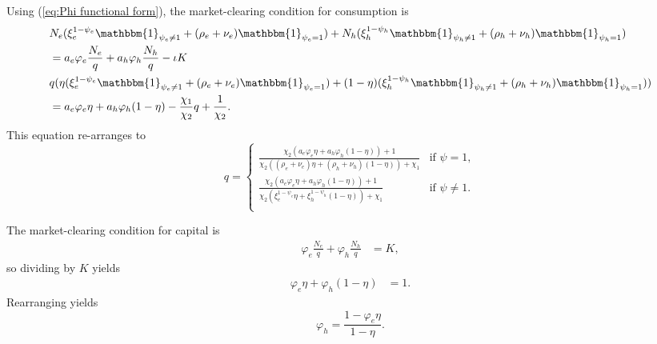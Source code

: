 \documentclass[12 pt, oneside]{article}
\theoremstyle{definition}
\theoremstyle{definition}
\theoremstyle{definition}
\begin{document}
Using (\ref{eq:Phi functional form}), the market-clearing condition for consumption is
\begin{align*}
& N_e(\xi_e^{1 - \psi_e}\mathbbm{1}_{\psi_e\neq 1} + (\rho_e + \nu_e)\mathbbm{1}_{\psi_e =1})+  N_h(\xi_h^{1 - \psi_h}\mathbbm{1}_{\psi_h\neq 1} + (\rho_h + \nu_h)\mathbbm{1}_{\psi_h = 1})\\
& =a_e\varphi_e \frac{N_e}{q} + a_h\varphi_h \frac{N_h}{q} - \iota K\\
& q(\eta(\xi_e^{1 - \psi_e}\mathbbm{1}_{\psi_e\neq 1} + (\rho_e + \nu_e)\mathbbm{1}_{\psi_e =1}) + (1 - \eta)(\xi_h^{1 - \psi_h}\mathbbm{1}_{\psi_h\neq 1} + (\rho_h + \nu_h)\mathbbm{1}_{\psi_h = 1}))\\
& =a_e\varphi_e\eta  + a_h\varphi_h (1 - \eta)  - \frac{\chi_1}{\chi_2}q + \frac{1}{\chi_2}.
\end{align*}
This equation re-arranges to %
\begin{equation}
  \label{eq:q closed form}
    q  =
    \begin{cases}
      \frac{\chi_2(a_e \varphi_e \eta + a_h \varphi_h(1 - \eta)) + 1}{\chi_2((\rho_e + \nu_e) \eta + ( \rho_h + \nu_h)(1 - \eta)) + \chi_1} & \text{if }\psi = 1,\\
      \frac{\chi_2(a_e \varphi_e \eta + a_h \varphi_h(1 - \eta)) + 1}{\chi_2( \xi_e^{1 - \psi_e} \eta + \xi_h^{1 - \psi_h}(1 -  \eta)) + \chi_1} & \text{if }\psi \neq 1.\\
    \end{cases}
\end{equation}


The market-clearing condition for capital is
\begin{align*}
  \varphi_e \frac{N_e }{q} + \varphi_h\frac{N_h}{q} & = K,
\end{align*}
so dividing by $K$ yields
\begin{align*}
  \varphi_e\eta + \varphi_h(1 - \eta) & = 1.
\end{align*}
Rearranging yields
\begin{equation}\label{eq:household leverage as function of experts leverage and eta }
  \varphi_h = \frac{1 - \varphi_e\eta}{1 - \eta}.
\end{equation}
\end{document}
